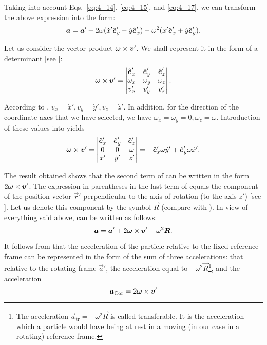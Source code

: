 \noindent
Taking into account Eqs.~\eqref{eq:4_14}, \eqref{eq:4_15}, and \eqref{eq:4_17}, we can transform the above expression into the form:
\begin{equation}\label{eq:4_19}
\boldsymbol{a} = \boldsymbol{a}' + 2\omega(\dot{x}'\hat{\boldsymbol{e}}_{y}' - \dot{y}\hat{\boldsymbol{e}}_{x}') - \omega^2(x'\hat{\boldsymbol{e}}_{x}' + \dot{y}\hat{\boldsymbol{e}}_{y}').
\end{equation}

Let us consider the vector product $\boldsymbol{\omega}\times\boldsymbol{v}'$. We shall represent it in the form of a determinant [see ]:
\begin{equation}\label{eq:4_20}
\boldsymbol{\omega}\times\boldsymbol{v}' = \begin{vmatrix}
\hat{\boldsymbol{e}}_{x}' & \hat{\boldsymbol{e}}_{y}' & \hat{\boldsymbol{e}}_{z}'\\
\omega_x & \omega_y & \omega_z\\
v_x' & v_y' & v_z'
\end{vmatrix}.
\end{equation}

\noindent
According to , $v_x=\dot{x}', v_y=\dot{y}', v_z=\dot{z}'$. In addition, for the direction of the coordinate axes that we have selected, we have $\omega_x=\omega_y=0, \omega_z=\omega$. Introduction of these values into  yields
\begin{equation}\label{eq:4_21}
\boldsymbol{\omega}\times\boldsymbol{v}' = \begin{vmatrix}
\hat{\boldsymbol{e}}_{x}' & \hat{\boldsymbol{e}}_{y}' & \hat{\boldsymbol{e}}_{z}'\\
0 & 0 & \omega\\
\dot{x}' & \dot{y}' & \dot{z}'
\end{vmatrix} = -\hat{\boldsymbol{e}}_{x}'\omega\dot{y}' + \hat{\boldsymbol{e}}_{y}'\omega\dot{x}'.
\end{equation}

\noindent
The result obtained shows that the second term of  can be written in the form $2\boldsymbol{\omega}\times\boldsymbol{v}'$. The expression in parentheses in the last term of  equals the component of the position vector $\vec{r}'$ perpendicular to the axis of rotation (to the axis $z'$) [see ]. Let us denote this component by the symbol $\vec{R}$ (compare with ). In view of everything said above,  can be written as follows:
\begin{equation}\label{eq:4_22}
\boldsymbol{a} = \boldsymbol{a}' + 2\boldsymbol{\omega}\times\boldsymbol{v}' - \omega^2\boldsymbol{R}.
\end{equation}

It follows from  that the acceleration of the particle relative to the fixed reference frame can be represented in the form of the sum of three accelerations: that relative to the rotating frame $\vec{a}'$, the acceleration equal to $-\omega^2\vec{R}$\footnote{The acceleration $\vec{a}_{\text{tr}}=-\omega^2\vec{R}$ is called transferable. It is the acceleration which a particle would have being at rest in a moving (in our case in a rotating) reference frame.}, and the acceleration
\begin{equation}\label{eq:4_23}
\boldsymbol{a}_{\text{Cor}} = 2\boldsymbol{\omega}\times\boldsymbol{v}'
\end{equation}

